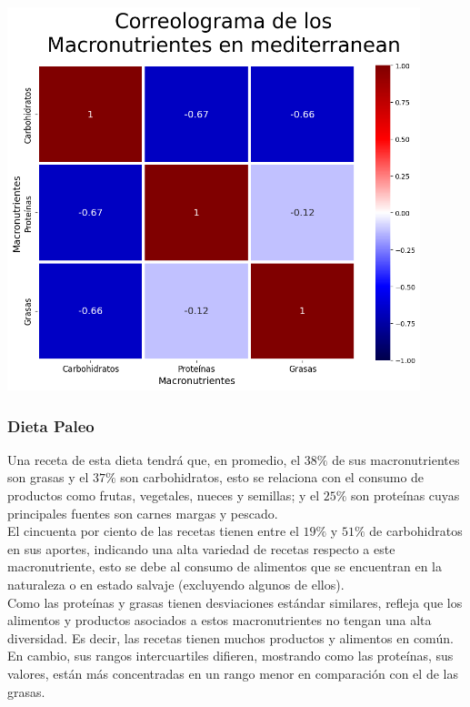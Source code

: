 \documentclass[12pt,a4paper]{article}
\begin{document}
            \begin{center}
                \includegraphics[width=0.90\textwidth]{Resources/2_03_plot_03_4.png}
            \end{center}

        \subsubsection{Dieta Paleo}

            Una receta de esta dieta tendrá que, en promedio, el $38\%$ de sus 
            macronutrientes son grasas y el $37\%$ son carbohidratos, esto se 
            relaciona con el consumo de productos como frutas, vegetales, nueces 
            y semillas; y el $25\%$ son proteínas cuyas principales fuentes son 
            carnes margas y pescado.\\

            El cincuenta por ciento de las recetas tienen entre el $19\%$ y $51\%$ 
            de carbohidratos en sus aportes, indicando una alta variedad de recetas 
            respecto a este macronutriente, esto se debe al consumo de alimentos que 
            se encuentran en la naturaleza o en estado salvaje (excluyendo algunos 
            de ellos).\\

            Como las proteínas y grasas tienen desviaciones estándar similares, refleja 
            que los alimentos y productos asociados a estos macronutrientes no tengan 
            una alta diversidad. Es decir, las recetas tienen muchos productos y alimentos 
            en común. En cambio, sus rangos intercuartiles difieren, mostrando como 
            las proteínas, sus valores, están más concentradas en un rango menor en 
            comparación con el de las grasas.
\end{document}
